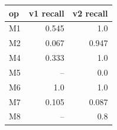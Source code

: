 \begin{tabular}{lrr}
\toprule
\textbf{op} & \textbf{v1 recall} & \textbf{v2 recall} \\
\midrule
M1 & 0.545 & 1.0 \\
M2 & 0.067 & 0.947 \\
M4 & 0.333 & 1.0 \\
M5 & -- & 0.0 \\
M6 & 1.0 & 1.0 \\
M7 & 0.105 & 0.087 \\
M8 & -- & 0.8 \\
\bottomrule
\end{tabular}
